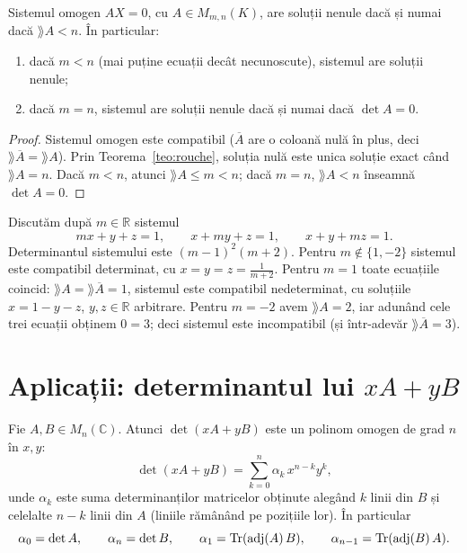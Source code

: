 \begin{corolar}\label{cor:omogen}
Sistemul omogen $AX=0$, cu $A\in M_{m,n}(K)$, are soluții nenule dacă și numai dacă $\rang A<n$. În particular:
\begin{enumerate}
\item dacă $m<n$ (mai puține ecuații decât necunoscute), sistemul are soluții nenule;
\item dacă $m=n$, sistemul are soluții nenule dacă și numai dacă $\det A=0$.
\end{enumerate}
\end{corolar}

\begin{proof}
Sistemul omogen este compatibil ($\overline A$ are o coloană nulă în plus, deci $\rang\overline A=\rang A$). Prin Teorema~\ref{teo:rouche}, soluția nulă este unica soluție exact când $\rang A=n$. Dacă $m<n$, atunci $\rang A\le m<n$; dacă $m=n$, $\rang A<n$ înseamnă $\det A=0$.
\end{proof}

\begin{exemplu}
Discutăm după $m\in\mathbb{R}$ sistemul
\[
mx+y+z=1,\qquad x+my+z=1,\qquad x+y+mz=1 .
\]
Determinantul sistemului este $(m-1)^2(m+2)$. Pentru $m\notin\{1,-2\}$ sistemul este compatibil determinat, cu $x=y=z=\frac1{m+2}$. Pentru $m=1$ toate ecuațiile coincid: $\rang A=\rang\overline A=1$, sistemul este compatibil nedeterminat, cu soluțiile $x=1-y-z$, $y,z\in\mathbb{R}$ arbitrare. Pentru $m=-2$ avem $\rang A=2$, iar adunând cele trei ecuații obținem $0=3$; deci sistemul este incompatibil (și într-adevăr $\rang\overline A=3$).
\end{exemplu}

\section{Aplicații: determinantul lui $xA+yB$}

\begin{lema}\label{lema:detxAyB}
Fie $A,B\in M_n(\mathbb{C})$. Atunci $\det(xA+yB)$ este un polinom omogen de grad $n$ în $x,y$:
\[
\det(xA+yB)=\sum_{k=0}^n\alpha_k\,x^{n-k}y^k,
\]
unde $\alpha_k$ este suma determinanților matricelor obținute alegând $k$ linii din $B$ și celelalte $n-k$ linii din $A$ (liniile rămânând pe pozițiile lor). În particular
\[
\alpha_0=\det A,\qquad\alpha_n=\det B,\qquad \alpha_1=\operatorname{Tr}(\operatorname{adj}(A)\,B),\qquad\alpha_{n-1}=\operatorname{Tr}(\operatorname{adj}(B)\,A).
\]
\end{lema}

